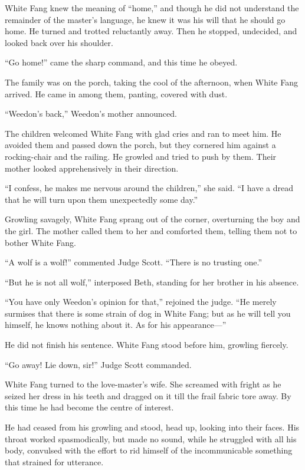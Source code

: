\documentclass[10pt]{book}
\begin{document}
White Fang knew the meaning of “home,” and though he did not understand
the remainder of the master’s language, he knew it was his will that he
should go home. He turned and trotted reluctantly away. Then he
stopped, undecided, and looked back over his shoulder.

“Go home!” came the sharp command, and this time he obeyed.

The family was on the porch, taking the cool of the afternoon, when
White Fang arrived. He came in among them, panting, covered with dust.

“Weedon’s back,” Weedon’s mother announced.

The children welcomed White Fang with glad cries and ran to meet him.
He avoided them and passed down the porch, but they cornered him
against a rocking-chair and the railing. He growled and tried to push
by them. Their mother looked apprehensively in their direction.

“I confess, he makes me nervous around the children,” she said. “I have
a dread that he will turn upon them unexpectedly some day.”

Growling savagely, White Fang sprang out of the corner, overturning the
boy and the girl. The mother called them to her and comforted them,
telling them not to bother White Fang.

“A wolf is a wolf!” commented Judge Scott. “There is no trusting one.”

“But he is not all wolf,” interposed Beth, standing for her brother in
his absence.

“You have only Weedon’s opinion for that,” rejoined the judge. “He
merely surmises that there is some strain of dog in White Fang; but as
he will tell you himself, he knows nothing about it. As for his
appearance—”

He did not finish his sentence. White Fang stood before him, growling
fiercely.

“Go away! Lie down, sir!” Judge Scott commanded.

White Fang turned to the love-master’s wife. She screamed with fright
as he seized her dress in his teeth and dragged on it till the frail
fabric tore away. By this time he had become the centre of interest.

He had ceased from his growling and stood, head up, looking into their
faces. His throat worked spasmodically, but made no sound, while he
struggled with all his body, convulsed with the effort to rid himself
of the incommunicable something that strained for utterance.
\end{document}
